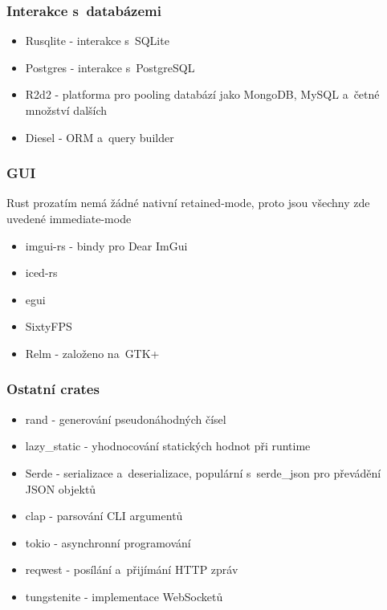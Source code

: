 \documentclass[a4paper, 12pt, twoside]{article} %
\begin{document}
		\subsubsection*{Interakce s~databázemi}
			\begin{itemize} 
				\item Rusqlite - interakce s~SQLite
				\item Postgres - interakce s~PostgreSQL
				\item R2d2 - platforma pro pooling databází jako MongoDB, MySQL a~četné množství dalších
				\item Diesel - ORM a~query builder
			\end{itemize}


		\subsubsection*{GUI}
			Rust prozatím nemá žádné nativní retained-mode, proto jsou všechny zde uvedené immediate-mode
			\begin{itemize} 
				\item imgui-rs - bindy pro Dear ImGui
				\item iced-rs
				\item egui
				\item SixtyFPS
				\item Relm - založeno na~GTK+
			\end{itemize}


		\subsubsection*{Ostatní crates}
			\begin{itemize}
				\item rand - generování pseudonáhodných čísel
				\item lazy\_static - yhodnocování statických hodnot při runtime
				\item Serde - serializace a~deserializace, populární s~serde\_json pro převádění JSON objektů
				\item clap - parsování CLI argumentů
				\item tokio - asynchronní programování
				\item reqwest - posílání a~přijímání HTTP zpráv
				\item tungstenite - implementace WebSocketů
			\end{itemize}
\end{document}
